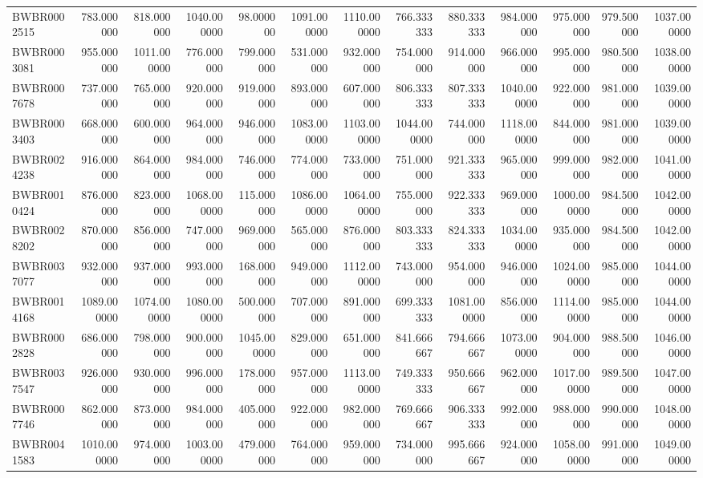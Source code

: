 \begin{longtable}{lrrrrrrrrrrrr}
BWBR0002515 & 783.000000 & 818.000000 & 1040.000000 & 98.000000 & 1091.000000 & 1110.000000 & 766.333333 & 880.333333 & 984.000000 & 975.000000 & 979.500000 & 1037.000000 \\
BWBR0003081 & 955.000000 & 1011.000000 & 776.000000 & 799.000000 & 531.000000 & 932.000000 & 754.000000 & 914.000000 & 966.000000 & 995.000000 & 980.500000 & 1038.000000 \\
BWBR0007678 & 737.000000 & 765.000000 & 920.000000 & 919.000000 & 893.000000 & 607.000000 & 806.333333 & 807.333333 & 1040.000000 & 922.000000 & 981.000000 & 1039.000000 \\
BWBR0003403 & 668.000000 & 600.000000 & 964.000000 & 946.000000 & 1083.000000 & 1103.000000 & 1044.000000 & 744.000000 & 1118.000000 & 844.000000 & 981.000000 & 1039.000000 \\
BWBR0024238 & 916.000000 & 864.000000 & 984.000000 & 746.000000 & 774.000000 & 733.000000 & 751.000000 & 921.333333 & 965.000000 & 999.000000 & 982.000000 & 1041.000000 \\
BWBR0010424 & 876.000000 & 823.000000 & 1068.000000 & 115.000000 & 1086.000000 & 1064.000000 & 755.000000 & 922.333333 & 969.000000 & 1000.000000 & 984.500000 & 1042.000000 \\
BWBR0028202 & 870.000000 & 856.000000 & 747.000000 & 969.000000 & 565.000000 & 876.000000 & 803.333333 & 824.333333 & 1034.000000 & 935.000000 & 984.500000 & 1042.000000 \\
BWBR0037077 & 932.000000 & 937.000000 & 993.000000 & 168.000000 & 949.000000 & 1112.000000 & 743.000000 & 954.000000 & 946.000000 & 1024.000000 & 985.000000 & 1044.000000 \\
BWBR0014168 & 1089.000000 & 1074.000000 & 1080.000000 & 500.000000 & 707.000000 & 891.000000 & 699.333333 & 1081.000000 & 856.000000 & 1114.000000 & 985.000000 & 1044.000000 \\
BWBR0002828 & 686.000000 & 798.000000 & 900.000000 & 1045.000000 & 829.000000 & 651.000000 & 841.666667 & 794.666667 & 1073.000000 & 904.000000 & 988.500000 & 1046.000000 \\
BWBR0037547 & 926.000000 & 930.000000 & 996.000000 & 178.000000 & 957.000000 & 1113.000000 & 749.333333 & 950.666667 & 962.000000 & 1017.000000 & 989.500000 & 1047.000000 \\
BWBR0007746 & 862.000000 & 873.000000 & 984.000000 & 405.000000 & 922.000000 & 982.000000 & 769.666667 & 906.333333 & 992.000000 & 988.000000 & 990.000000 & 1048.000000 \\
BWBR0041583 & 1010.000000 & 974.000000 & 1003.000000 & 479.000000 & 764.000000 & 959.000000 & 734.000000 & 995.666667 & 924.000000 & 1058.000000 & 991.000000 & 1049.000000 \\

\end{longtable}
